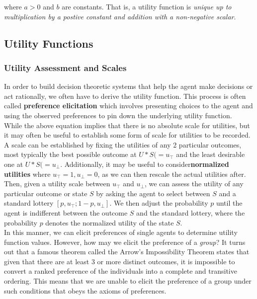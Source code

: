 \documentclass[11pt]{article}
\begin{document}
where $a > 0$ and $b$ are constants. That is, a utility function is \textit{unique up to multiplication by a postive constant and addition with a non-negative scalar}.
 
\subsection{Utility Functions}

\subsubsection{Utility Assessment and Scales}

In order to build decision theoretic systems that help the agent make decisions or act rationally, we often have to derive the utility function. This process is often called \textbf{preference elicitation} which involves presenting choices to the agent and using the observed preferences to pin down the underlying utility function.\\

While the above equation implies that there is no absolute scale for utilities, but it may often be useful to establish some form of scale for utilities to be recorded. A scale can be established by fixing the utilities of any 2 particular outcomes, most typically the best possible outcome at $U*S( = u_{\top}$ and the least desirable one at $U*S( = u_{\perp}$. Additionally, it may be useful to consider\textbf{normalized utilities} where $u_{\top} = 1, u_{\perp} = 0$, as we can then rescale the actual utilities after.\\

Then, given a utility scale between $u_{\top}$ and $u_{\perp}$, we can assess the utility of any particular outcome or state $S$ by asking the agent to select between $S$ and a standard lottery $[p, u_{\top}; 1-p, u_{\perp}]$. We then adjust the probability $p$ until the agent is indifferent between the outcome $S$ and the standard lottery, where the probability $p$ denotes the normalized utility of the state $S$.\\

In this manner, we can elicit preferences of single agents to determine utility function values. However, how may we elicit the preference of a \textit{group}? It turns out that a famous theorem called the Arrow's Impossibility Theorem states that given that there are at least 3 or more distinct outcomes, it is impossible to convert a ranked preference of the individuals into a complete and transitive ordering. This means that we are unable to elicit the preference of a group under such conditions that obeys the axioms of preferences.
\end{document}
